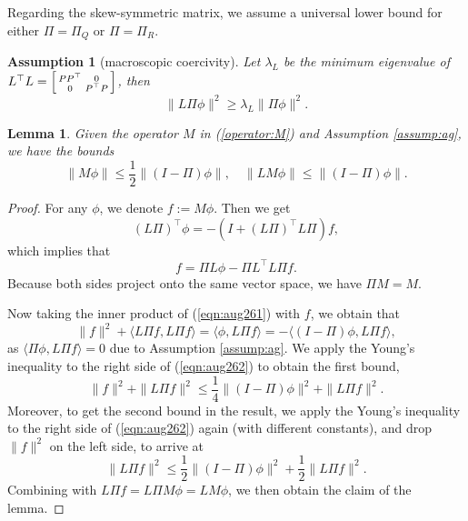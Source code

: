 \documentclass[11pt]{article}
\newtheorem{assumption}{Assumption}
\newtheorem{lemma}[theorem]{Lemma}
\newcommand{\1}{\mathds{1}}
\begin{document}
Regarding the skew-symmetric matrix, we assume a universal lower bound for either $\Pi=\Pi_Q$ or $\Pi=\Pi_R$.
\begin{assumption}[macroscopic coercivity]\label{assump:L}
Let $\lambda_L$ be the minimum eigenvalue of $L^{\top}L = \Bigl[ \begin{smallmatrix}
            PP^\top & 0\\
            0 & P^\top P
        \end{smallmatrix}\Bigr]$, then
        \begin{equation}
            \|L\Pi\phi\|^2\geq \lambda_L \|\Pi\phi\|^2.
        \end{equation}
\end{assumption}


\begin{lemma}\label{lem:bounds}
    Given the operator $M$ in (\ref{operator:M}) and Assumption \ref{assump:ag}, we have the bounds
    \begin{equation}
         \|M\phi\|\leq \frac{1}{2}\|(I-\Pi)\phi\|,\quad \|LM\phi\|\leq\|(I-\Pi)\phi\|.
    \end{equation}
\end{lemma}
\begin{proof}
   For any $\phi$, we denote $f := M\phi$. Then we get
   \begin{equation}\label{eqn:aug261}
       (L\Pi)^{\top} \phi = -( I+(L\Pi)^{\top} L\Pi) f,
   \end{equation}
   which implies that
   \begin{equation}
     f = \Pi L \phi-\Pi L^\top L \Pi f.
   \end{equation}
Because both sides project onto the same vector space, we have $\Pi M = M$.

   Now taking the inner product of (\ref{eqn:aug261}) with $f$, we obtain that
   \begin{equation}\label{eqn:aug262}
  \|f\|^2 + \langle L\Pi f, L\Pi f\rangle =     \langle \phi, L\Pi f\rangle  = -\langle (I-\Pi)\phi, L\Pi f\rangle,
   \end{equation}
   as $\langle \Pi\phi, L\Pi f\rangle = 0$ due to Assumption \ref{assump:ag}. We apply the Young's inequality to the right side of (\ref{eqn:aug262}) to obtain the first bound,
   \begin{equation}
    \|f\|^2 + \|L\Pi f\|^2\leq \frac{1}{4}\|(I-\Pi)\phi\|^2 + \|L\Pi f\|^2.
   \end{equation}
   Moreover, to get the second bound in the result, we apply the Young's inequality to the right side  of (\ref{eqn:aug262}) again (with different constants), and drop $\|f\|^2$ on the left side, to arrive at
   \begin{equation}
       \|L\Pi f\|^2\leq\frac{1}{2}\|(I-\Pi)\phi\|^2 + \frac{1}{2}\|L\Pi f\|^2.
   \end{equation}
   Combining with $L\Pi f = L\Pi M\phi = LM\phi$, we then obtain the claim of the lemma.
\end{proof}
\end{document}
